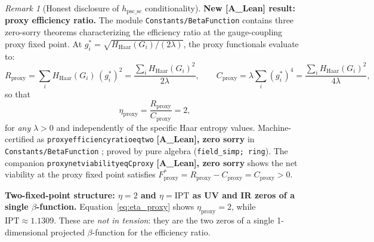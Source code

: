 \documentclass[11pt]{article}
\theoremstyle{remark}
\newtheorem{remark}[theorem]{Remark}
\newcommand{\IPT}{\mathrm{IPT}}
\newcommand{\lean}[1]{%
  \penalty-100
  \begingroup
  \def\_{\textunderscore\allowbreak}%
  \texttt{#1}%
  \endgroup
}
\begin{document}
\begin{remark}[Honest disclosure of $h_{\mathrm{psc\_sc}}$ conditionality]
\textbf{New [A\_Lean] result: proxy efficiency ratio.}
The module \lean{Constants/BetaFunction} contains three zero-sorry theorems
characterizing the efficiency ratio at the gauge-coupling proxy fixed point.
At $g_i^* = \sqrt{H_{\mathrm{Haar}}(G_i)/(2\lambda)}$, the proxy functionals evaluate to:
\begin{equation}
R_{\mathrm{proxy}} = \sum_i H_{\mathrm{Haar}}(G_i)\,(g_i^*)^2 = \frac{\textstyle\sum_i H_{\mathrm{Haar}}(G_i)^2}{2\lambda},
\qquad
C_{\mathrm{proxy}} = \lambda\sum_i (g_i^*)^4 = \frac{\textstyle\sum_i H_{\mathrm{Haar}}(G_i)^2}{4\lambda},
\end{equation}
so that
\begin{equation}
\label{eq:eta_proxy}
\eta_{\mathrm{proxy}} = \frac{R_{\mathrm{proxy}}}{C_{\mathrm{proxy}}} = 2,
\end{equation}
for \emph{any} $\lambda > 0$ and independently of the specific Haar entropy values.
Machine-certified as \lean{proxy\_efficiency\_ratio\_eq\_two} \textbf{[A\_Lean], zero sorry}
in \lean{Constants/BetaFunction}; proved by pure algebra (\texttt{field\_simp; ring}).
The companion \lean{proxy\_net\_viability\_eq\_C\_proxy} \textbf{[A\_Lean], zero sorry}
shows the net viability at the proxy fixed point satisfies
$F_{\mathrm{proxy}}^* = R_{\mathrm{proxy}} - C_{\mathrm{proxy}} = C_{\mathrm{proxy}} > 0$.

\textbf{Two-fixed-point structure: $\eta = 2$ and $\eta = \IPT$ as UV and IR zeros
of a single $\beta$-function.}
Equation~\eqref{eq:eta_proxy} shows $\eta_{\mathrm{proxy}} = 2$, while
$\IPT \approx 1.1309$.  These are \emph{not in tension}: they are the two zeros of a
single 1-dimensional projected $\beta$-function for the efficiency ratio.


\end{remark}
\end{document}
